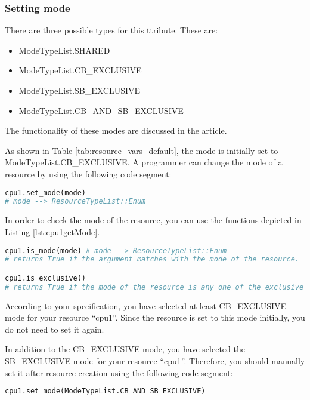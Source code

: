 \documentclass[]{scrartcl}
\begin{document}
\subsubsection{Setting mode}
There are three possible types for this ttribute. These are:
\begin{itemize}
    \item \textsf{ModeTypeList.SHARED}
    \item \textsf{ModeTypeList.CB\_EXCLUSIVE}
    \item \textsf{ModeTypeList.SB\_EXCLUSIVE}
    \item \textsf{ModeTypeList.CB\_AND\_SB\_EXCLUSIVE}
\end{itemize}
The functionality of these modes are discussed in the article.

As shown in Table \ref{tab:resource_vars_default}, the mode is initially set to \textsf{ModeTypeList.CB\_EXCLUSIVE}. A programmer can change the mode of a resource by using the following code segment:

\begin{lstlisting}[language=Python, frame=single, label={lst:cpu1setMode}, caption={Setting the mode of a resource after creating a resource.}]
cpu1.set_mode(mode)
# mode --> ResourceTypeList::Enum
\end{lstlisting}
        

In order to check the mode of the resource, you can use the functions depicted in Listing \ref{lst:cpu1getMode}.

\begin{lstlisting}[language=Python, frame=single, label={lst:cpu1getMode}, caption={The functions for resource mode check.}]
cpu1.is_mode(mode) # mode --> ResourceTypeList::Enum
# returns True if the argument matches with the mode of the resource.

cpu1.is_exclusive()
# returns True if the mode of the resource is any one of the exclusive mode.
\end{lstlisting}
        
        
According to your specification, you have selected at least \textsf{CB\_EXCLUSIVE} mode for your resource ``cpu1''. Since the resource is set to this mode initially, you do not need to set it again.
        
In addition to the CB\_EXCLUSIVE mode, you have selected the \textsf{SB\_EXCLUSIVE} mode for your resource ``cpu1''. Therefore, you should manually set it after resource creation using the following code segment:

\begin{lstlisting}[language=Python, frame=single, label={lst:cpu1setCBSBExclusiveResource}, caption={The resource is set to CB\_AND\_SB\_EXCLUSIVE mode.}]
cpu1.set_mode(ModeTypeList.CB_AND_SB_EXCLUSIVE)
\end{lstlisting}
        
\end{document}
